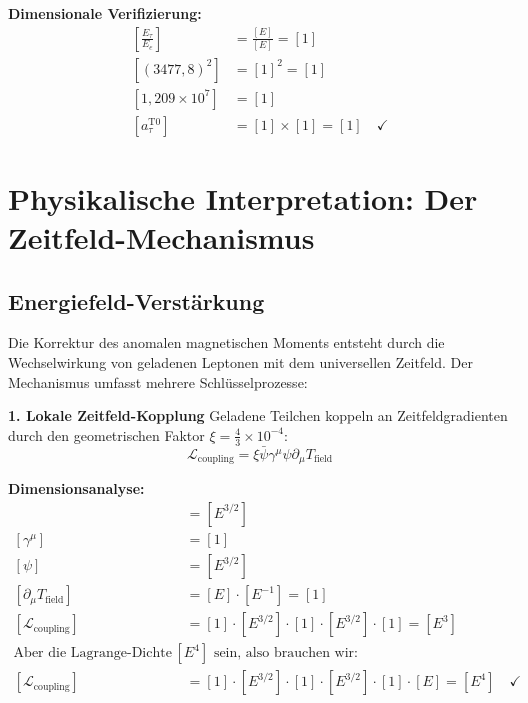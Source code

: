 \documentclass[12pt,a4paper]{report}
\begin{document}
	\textbf{Dimensionale Verifizierung:}
	\begin{align}
		\left[\frac{E_\tau}{E_e}\right] &= \frac{[E]}{[E]} = [1] \\
		[(3477,8)^2] &= [1]^2 = [1] \\
		[1,209 \times 10^7] &= [1] \\
		[a_\tau^{\text{T0}}] &= [1] \times [1] = [1] \quad \checkmark
	\end{align}
	
	\section{Physikalische Interpretation: Der Zeitfeld-Mechanismus}
	\label{sec:physical_interpretation}
	
	\subsection{Energiefeld-Verstärkung}
	\label{subsec:energy_field_enhancement}
	
	Die Korrektur des anomalen magnetischen Moments entsteht durch die Wechselwirkung von geladenen Leptonen mit dem universellen Zeitfeld. Der Mechanismus umfasst mehrere Schlüsselprozesse:
	
	\textbf{1. Lokale Zeitfeld-Kopplung}
	Geladene Teilchen koppeln an Zeitfeldgradienten durch den geometrischen Faktor $\xi = \frac{4}{3} \times 10^{-4}$:
	\begin{equation}
		\mathcal{L}_{\text{coupling}} = \xi \bar{\psi} \gamma^\mu \psi \partial_\mu T_{\text{field}}
	\end{equation}
	
	\textbf{Dimensionsanalyse:}
	\begin{align}
		[\bar{\psi}] &= [E^{3/2}] \\
		[\gamma^\mu] &= [1] \\
		[\psi] &= [E^{3/2}] \\
		[\partial_\mu T_{\text{field}}] &= [E] \cdot [E^{-1}] = [1] \\
		[\mathcal{L}_{\text{coupling}}] &= [1] \cdot [E^{3/2}] \cdot [1] \cdot [E^{3/2}] \cdot [1] = [E^3] \\
		\text{Aber die Lagrange-Dichte sollte } [E^4] \text{ sein, also brauchen wir:} \\
		[\mathcal{L}_{\text{coupling}}] &= [1] \cdot [E^{3/2}] \cdot [1] \cdot [E^{3/2}] \cdot [1] \cdot [E] = [E^4] \quad \checkmark
	\end{align}
	
\end{document}
